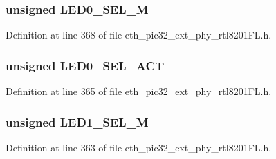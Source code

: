 \subsubsection[{L\+E\+D0\+\_\+\+S\+E\+L\+\_\+10\+M}]{\setlength{\rightskip}{0pt plus 5cm}unsigned L\+E\+D0\+\_\+\+S\+E\+L\+\_\+M}\label{union___c_u_s_t_o_m_i_z_e_d_l_e_d_s__t_a7c9f6fabd898bb6d53ffaa1d451d358f}


Definition at line 368 of file eth\+\_\+pic32\+\_\+ext\+\_\+phy\+\_\+rtl8201\+F\+L.\+h.

\hypertarget{union___c_u_s_t_o_m_i_z_e_d_l_e_d_s__t_a815406bc0c2f15c36c7c01b2346941f9}{}
\subsubsection[{L\+E\+D0\+\_\+\+S\+E\+L\+\_\+\+A\+C\+T}]{\setlength{\rightskip}{0pt plus 5cm}unsigned L\+E\+D0\+\_\+\+S\+E\+L\+\_\+\+A\+C\+T}\label{union___c_u_s_t_o_m_i_z_e_d_l_e_d_s__t_a815406bc0c2f15c36c7c01b2346941f9}


Definition at line 365 of file eth\+\_\+pic32\+\_\+ext\+\_\+phy\+\_\+rtl8201\+F\+L.\+h.

\hypertarget{union___c_u_s_t_o_m_i_z_e_d_l_e_d_s__t_a5159a6163e9890b1223ae7d3d3247289}{}
\subsubsection[{L\+E\+D1\+\_\+\+S\+E\+L\+\_\+100\+M}]{\setlength{\rightskip}{0pt plus 5cm}unsigned L\+E\+D1\+\_\+\+S\+E\+L\+\_\+M}\label{union___c_u_s_t_o_m_i_z_e_d_l_e_d_s__t_a5159a6163e9890b1223ae7d3d3247289}


Definition at line 363 of file eth\+\_\+pic32\+\_\+ext\+\_\+phy\+\_\+rtl8201\+F\+L.\+h.

